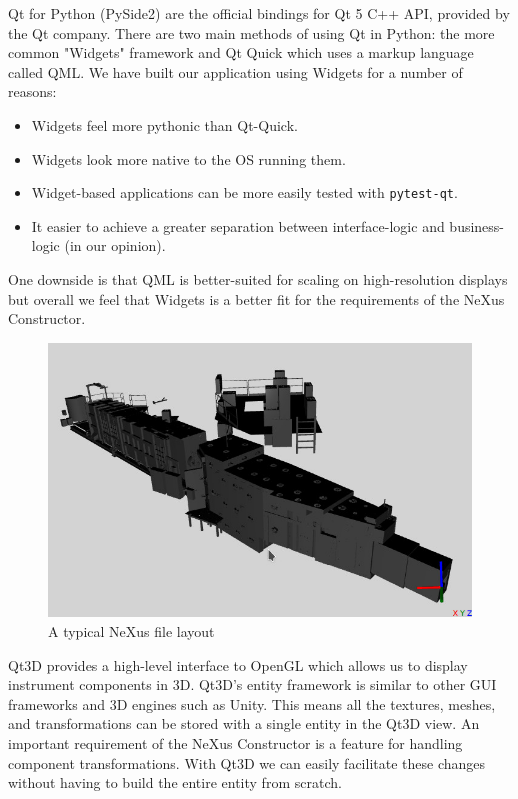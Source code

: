 Qt for Python (PySide2) are the official bindings for Qt 5 C++ API, provided by the Qt company. There are two main methods of using Qt in Python: the more common "Widgets" framework and Qt Quick which uses a markup language called QML. We have built our application using Widgets for a number of reasons: 
\begin{itemize}
\item Widgets feel more pythonic than Qt-Quick.
\item Widgets look more native to the OS running them.
\item Widget-based applications can be more easily tested with \texttt{pytest-qt}.
\item It easier to achieve a greater separation between interface-logic and business-logic (in our opinion).
\end{itemize}

One downside is that QML is better-suited for scaling on high-resolution displays but overall we feel that Widgets is a better fit for the requirements of the NeXus Constructor.

\begin{figure}
\begin{center}
\includegraphics[width=\linewidth]{zoom.jpg}
\end{center}
\caption{A typical NeXus file layout}
\end{figure}

Qt3D provides a high-level interface to OpenGL which allows us to display instrument components in 3D. Qt3D's entity framework is similar to other GUI frameworks and 3D engines such as Unity. This means all the textures, meshes, and transformations can be stored with a single entity in the Qt3D view. An important requirement of the NeXus Constructor is a feature for handling component transformations. With Qt3D we can easily facilitate these changes without having to build the entire entity from scratch.
